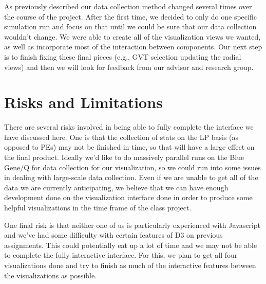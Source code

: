 \documentclass{acm_proc_article-sp}
\begin{document}
As previously described our data collection method changed several times over the course of the project.  After the first time, we decided to only do one specific simulation run and focus on that until we could be sure that our data collection wouldn't change.  We were able to create all of the visualization views we wanted, as well as incorporate most of the interaction between components.    Our next step is to finish fixing these final pieces (e.g., GVT selection updating the radial views) and then we will look for feedback from our advisor and research group.  

\section{Risks and Limitations}
There are several risks involved in being able to fully complete the interface we have discussed here.  One is that the collection of stats on the LP basis (as opposed to PEs) may not be finished in time, so that will have a large effect on the final product.  Ideally we'd like to do massively parallel runs on the Blue Gene/Q for data collection for our visualization, so we could run into some issues in dealing with large-scale data collection.  Even if we are unable to get all of the data we are currently anticipating, we believe that we can have enough development done on the visualization interface done in order to produce some helpful visualizations in the time frame of the class project.

One final risk is that neither one of us is particularly experienced with Javascript and we've had some difficulty with certain features of D3 on previous assignments.   This could potentially eat up a lot of time and we may not be able to complete the fully interactive interface.  For this, we plan to get all four visualizations done and try to finish as much of the interactive features between the visualizations as possible.  
    
\end{document}
